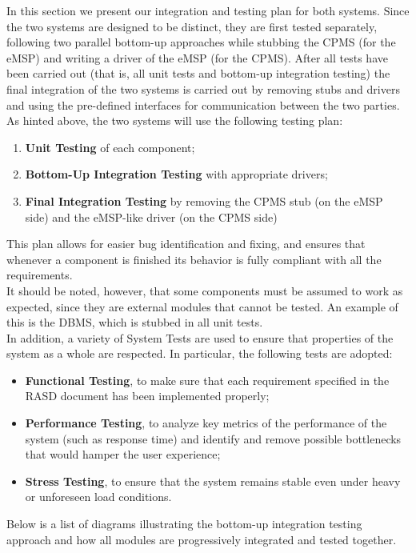 \documentclass[11pt]{article}
\begin{document}
In this section we present our integration and testing plan for both systems. Since the two systems are designed to be distinct, they are first tested separately, following two parallel bottom-up approaches while stubbing the CPMS (for the eMSP) and writing a driver of the eMSP (for the CPMS). After all tests have been carried out (that is, all unit tests and bottom-up integration testing) the final integration of the two systems is carried out by removing stubs and drivers and using the pre-defined interfaces for communication between the two parties. \\
As hinted above, the two systems will use the following testing plan:
\begin{enumerate}
    \item \textbf{Unit Testing} of each component;
    \item \textbf{Bottom-Up Integration Testing} with appropriate drivers;
    \item \textbf{Final Integration Testing} by removing the CPMS stub (on the eMSP side) and the eMSP-like driver (on the CPMS side)
\end{enumerate}
This plan allows for easier bug identification and fixing, and ensures that whenever a component is finished its behavior is fully compliant with all the requirements. \\
It should be noted, however, that some components must be assumed to work as expected, since they are external modules that cannot be tested. An example of this is the DBMS, which is stubbed in all unit tests. \\
In addition, a variety of System Tests are used to ensure that properties of the system as a whole are respected. In particular, the following tests are adopted:
\begin{itemize}
    \item \textbf{Functional Testing}, to make sure that each requirement specified in the RASD document has been implemented properly;
    \item \textbf{Performance Testing}, to analyze key metrics of the performance of the system (such as response time) and identify and remove possible bottlenecks that would hamper the user experience;
    \item \textbf{Stress Testing}, to ensure that the system remains stable even under heavy or unforeseen load conditions.
\end{itemize}
Below is a list of diagrams illustrating the bottom-up integration testing approach and how all modules are progressively integrated and tested together. \\
\end{document}
